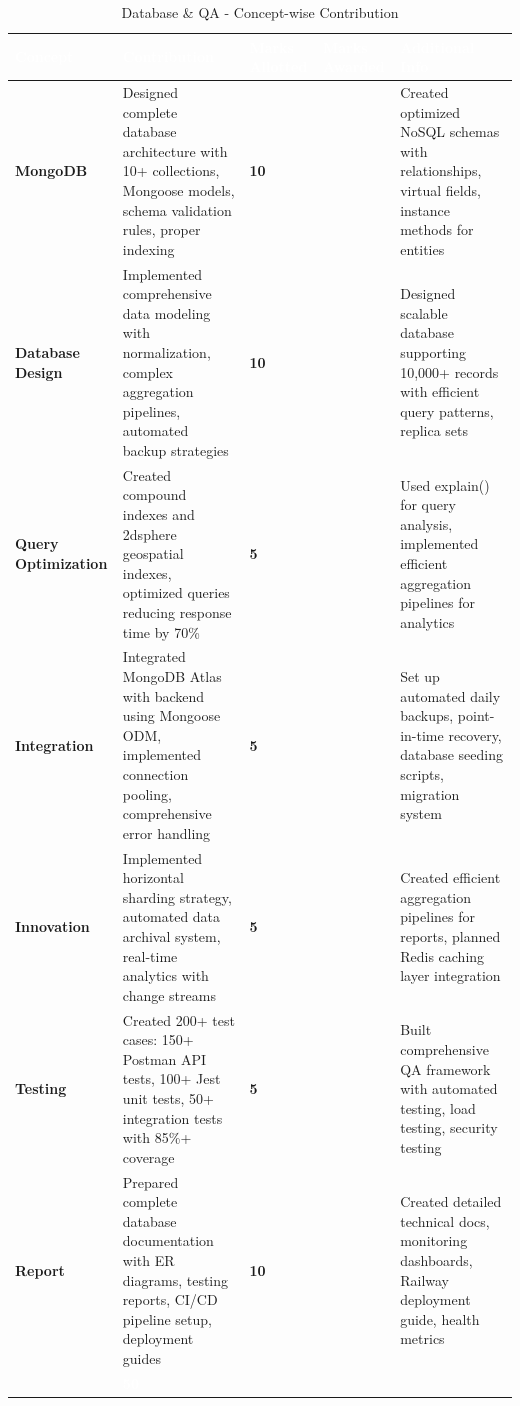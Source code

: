 \documentclass[12pt,a4paper]{article}
\begin{document}
\begin{table}[h!]
\centering
\renewcommand{\arraystretch}{1.4}
\begin{tabular}{|p{2.5cm}|p{4.5cm}|>{\centering\arraybackslash}p{2cm}|>{\centering\arraybackslash}p{2cm}|p{4cm}|}
\hline
\rowcolor{headerblue}
\textcolor{white}{\textbf{Concept}} & 
\textcolor{white}{\textbf{Contribution}} & 
\textcolor{white}{\textbf{Marks Allotted}} & 
\textcolor{white}{\textbf{Marks Awarded}} & 
\textcolor{white}{\textbf{Additional Info}} \\
\hline
\rowcolor{lightgray}
\textbf{MongoDB} & Designed complete database architecture with 10+ collections, Mongoose models, schema validation rules, proper indexing & \textbf{10} & & Created optimized NoSQL schemas with relationships, virtual fields, instance methods for entities \\
\hline

\textbf{Database Design} & Implemented comprehensive data modeling with normalization, complex aggregation pipelines, automated backup strategies & \textbf{10} & & Designed scalable database supporting 10,000+ records with efficient query patterns, replica sets \\
\hline
\rowcolor{lightgray}
\textbf{Query Optimization} & Created compound indexes and 2dsphere geospatial indexes, optimized queries reducing response time by 70\% & \textbf{5} & & Used explain() for query analysis, implemented efficient aggregation pipelines for analytics \\
\hline

\textbf{Integration} & Integrated MongoDB Atlas with backend using Mongoose ODM, implemented connection pooling, comprehensive error handling & \textbf{5} & & Set up automated daily backups, point-in-time recovery, database seeding scripts, migration system \\
\hline
\rowcolor{lightgray}
\textbf{Innovation} & Implemented horizontal sharding strategy, automated data archival system, real-time analytics with change streams & \textbf{5} & & Created efficient aggregation pipelines for reports, planned Redis caching layer integration \\
\hline

\textbf{Testing} & Created 200+ test cases: 150+ Postman API tests, 100+ Jest unit tests, 50+ integration tests with 85\%+ coverage & \textbf{5} & & Built comprehensive QA framework with automated testing, load testing, security testing \\
\hline
\rowcolor{lightgray}
\textbf{Report} & Prepared complete database documentation with ER diagrams, testing reports, CI/CD pipeline setup, deployment guides & \textbf{10} & & Created detailed technical docs, monitoring dashboards, Railway deployment guide, health metrics \\
\hline
\hline
\rowcolor{headerblue}
\multicolumn{2}{|r|}{\textcolor{white}{\textbf{TOTAL}}} & \textcolor{white}{\textbf{50}} & & \\
\hline
\end{tabular}
\caption{Database \& QA - Concept-wise Contribution}
\renewcommand{\arraystretch}{1}
\end{table}
\end{document}
